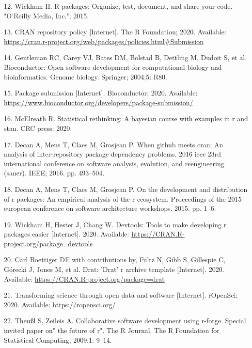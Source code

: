 \documentclass[10pt,letterpaper]{article}
\begin{document}
\leavevmode\hypertarget{ref-wickham2015}{}%
12. Wickham H. R packages: Organize, test, document, and share your
code. "O'Reilly Media, Inc."; 2015.

\leavevmode\hypertarget{ref-cranpolicy2020}{}%
13. CRAN repository policy {[}Internet{]}. The R Foundation; 2020.
Available:
\url{https://cran.r-project.org/web/packages/policies.html\#Submission}

\leavevmode\hypertarget{ref-gentleman2004}{}%
14. Gentleman RC, Carey VJ, Bates DM, Bolstad B, Dettling M, Dudoit S,
et al. Bioconductor: Open software development for computational biology
and bioinformatics. Genome biology. Springer; 2004;5: R80.

\leavevmode\hypertarget{ref-biocpkgsub2020}{}%
15. Package submission {[}Internet{]}. Bioconductor; 2020. Available:
\url{https://www.bioconductor.org/developers/package-submission/}

\leavevmode\hypertarget{ref-mcelreath2020}{}%
16. McElreath R. Statistical rethinking: A bayesian course with examples
in r and stan. CRC press; 2020.

\leavevmode\hypertarget{ref-decan2016}{}%
17. Decan A, Mens T, Claes M, Grosjean P. When github meets cran: An
analysis of inter-repository package dependency problems. 2016 ieee 23rd
international conference on software analysis, evolution, and
reengineering (saner). IEEE; 2016. pp. 493--504.

\leavevmode\hypertarget{ref-decan2015}{}%
18. Decan A, Mens T, Claes M, Grosjean P. On the development and
distribution of r packages: An empirical analysis of the r ecosystem.
Proceedings of the 2015 european conference on software architecture
workshops. 2015. pp. 1--6.

\leavevmode\hypertarget{ref-devtools}{}%
19. Wickham H, Hester J, Chang W. Devtools: Tools to make developing r
packages easier {[}Internet{]}. 2020. Available:
\url{https://CRAN.R-project.org/package=devtools}

\leavevmode\hypertarget{ref-drat}{}%
20. Carl Boettiger DE with contributions by, Fultz N, Gibb S, Gillespie
C, Górecki J, Jones M, et al. Drat: 'Drat' r archive template
{[}Internet{]}. 2020. Available:
\url{https://CRAN.R-project.org/package=drat}

\leavevmode\hypertarget{ref-ropensci2020}{}%
21. Transforming science through open data and software {[}Internet{]}.
rOpenSci; 2020. Available: \url{https://ropensci.org/}

\leavevmode\hypertarget{ref-theussl2009}{}%
22. Theußl S, Zeileis A. Collaborative software development using
r-forge. Special invited paper on" the future of r". The R Journal. The
R Foundation for Statistical Computing; 2009;1: 9--14.
\end{document}
